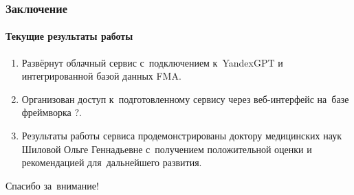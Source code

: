 \documentclass{beamer}
\begin{document}
\begin{frame}
  \frametitle{Заключение}
  \framesubtitle{Текущие результаты работы}

  \begin{enumerate}
  \item {
    Развёрнут облачный сервис с~подключением к~YandexGPT и интегрированной базой данных FMA. 
  }
  \item {
    Организован доступ к~подготовленному сервису через веб-интерфейс на~базе фреймворка ?.
  }
  \item {
    Результаты работы сервиса продемонстрированы доктору медицинских наук Шиловой Ольге Геннадьевне с~получением положительной оценки и рекомендацией для~дальнейшего развития.
    }
    \end{enumerate}
\end{frame}

\begin{frame}
  \begin{center}
{\Large Спасибо за~внимание!}
    \end{center}
  \end{frame}
\end{document}

